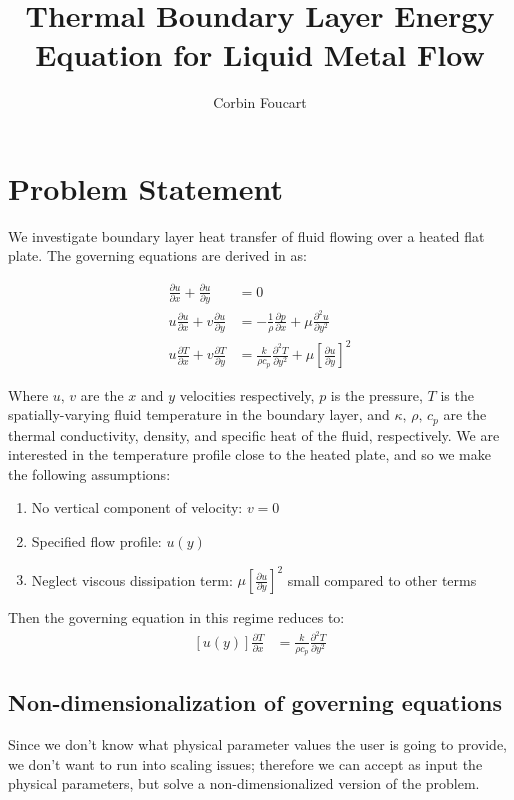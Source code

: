 \documentclass[10pt]{article}
\title{Thermal Boundary Layer Energy Equation for Liquid Metal Flow}
\author{Corbin Foucart}
\date{}
\begin{document}
\maketitle

\section{Problem Statement}
We investigate boundary layer heat transfer of fluid flowing over a heated flat plate. The governing
equations are derived in \cite{incropera} as:

\begin{align}
  \frac{\partial u}{\partial x} + \frac{\partial u}{\partial y} &= 0 \\
  u\frac{\partial u}{\partial x} + v\frac{\partial u}{\partial y} 
  &=  -\frac{1}{\rho}\frac{\partial p}{\partial x} + \mu \frac{\partial^2 u}{\partial
  y^2} \\
  u\frac{\partial T}{\partial x} + v\frac{\partial T}{\partial y} 
  &= \frac{k}{\rho c_p} \frac{\partial^2 T}{\partial y^2} + \mu\left[ \frac{\partial u}{\partial
  y}\right]^{2}
  \label{eq:BLeqns}
\end{align}

Where $u,\,v$ are the $x$ and $y$ velocities respectively, $p$ is the pressure, $T$ is the
spatially-varying fluid temperature in the boundary layer, and $\kappa,\, \rho,\, c_p$ are the
thermal conductivity, density, and specific heat of the fluid, respectively. We are interested in
the temperature profile close to the heated plate, and so we make the following assumptions:

\begin{enumerate}
  \item No vertical component of velocity: $v=0$
  \item Specified flow profile: $u(y)$
  \item Neglect viscous dissipation term: $\mu\left[ \frac{\partial u}{\partial y}
    \right]^{2}$ small compared to other terms
\end{enumerate}

Then the governing equation in this regime reduces to:
\begin{align}
  \left[u(y)\right]\frac{\partial T}{\partial x} 
  &= \frac{k}{\rho c_p} \frac{\partial^2 T}{\partial y^2} 
\end{align}

  \subsection{Non-dimensionalization of governing equations}
    Since we don't know what physical parameter values the user is going to provide, we don't want
    to run into scaling issues; therefore we can accept as input the physical parameters, but solve
    a non-dimensionalized version of the problem. \\
\end{document}
